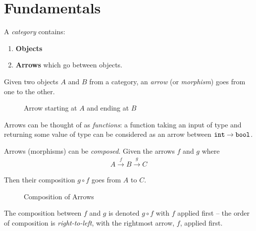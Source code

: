 \section{Fundamentals}

\begin{definition}[Category]
    A \textit{category} contains:
    \begin{enumerate}
        \item \textbf{Objects}
        \item \textbf{Arrows} which go between objects.
    \end{enumerate}
\end{definition}

\begin{definition}
    Given two objects $A$ and $B$ from a category, an \textit{arrow} (or \textit{morphism}) goes from one to the other.
    
    \begin{figure}[H]
        \centering
        \caption{Arrow starting at $A$ and ending at $B$}
        \label{fig:arrow}
    \end{figure}
\end{definition}

\begin{remark}
    Arrows can be thought of as \textit{functions}: a function taking an input of type  and returning some value of type  can be considered as an arrow between $\mathtt{int} \to \mathtt{bool}$.
\end{remark}

\begin{definition}
    Arrows (morphisms) can be \textit{composed}. Given the arrows $f$ and $g$ where
    \begin{equation}
        \begin{aligned}
            A \xrightarrow{f} B \xrightarrow{g} C
        \end{aligned}
    \end{equation}
    
    Then their composition $g \circ f$ goes from $A$ to $C$.
    
    \begin{figure}[H]
        \centering
        \caption{Composition of Arrows}
        \label{fig:arrow-composition}
    \end{figure}
\end{definition}

\begin{remark}
    The composition between $f$ and $g$ is denoted $g \circ f$ with $f$ applied first -- the order of composition is \textit{right-to-left}, with the rightmost arrow, $f$, applied first.
\end{remark}
